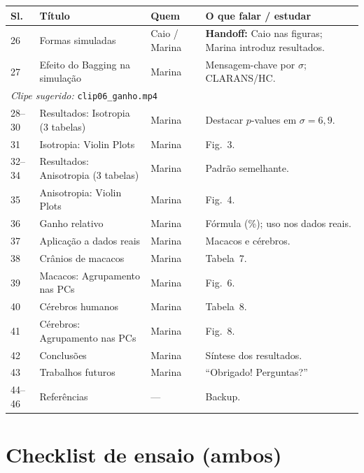 \documentclass[12pt,a4paper]{article}
\begin{document}
\begin{longtable}{@{}p{1.1cm}p{5.2cm}p{2cm}p{5.9cm}@{}}
\toprule
\textbf{Sl.} & \textbf{Título} & \textbf{Quem} & \textbf{O que falar / estudar} \\
\midrule
\endhead
26 & Formas simuladas & Caio / Marina & \textbf{Handoff:} Caio nas figuras; Marina introduz resultados. \\
27 & Efeito do Bagging na simulação & Marina & Mensagem-chave por $\sigma$; CLARANS/HC. \\
\midrule
\multicolumn{4}{l}{\textit{Clipe sugerido:} \texttt{clip06\_ganho.mp4}} \\
\midrule
28--30 & Resultados: Isotropia (3 tabelas) & Marina & Destacar $p$-values em $\sigma=6,9$. \\
31 & Isotropia: Violin Plots & Marina & Fig.~3. \\
32--34 & Resultados: Anisotropia (3 tabelas) & Marina & Padrão semelhante. \\
35 & Anisotropia: Violin Plots & Marina & Fig.~4. \\
36 & Ganho relativo & Marina & Fórmula (\%); uso nos dados reais. \\
37 & Aplicação a dados reais & Marina & Macacos e cérebros. \\
38 & Crânios de macacos & Marina & Tabela~7. \\
39 & Macacos: Agrupamento nas PCs & Marina & Fig.~6. \\
40 & Cérebros humanos & Marina & Tabela~8. \\
41 & Cérebros: Agrupamento nas PCs & Marina & Fig.~8. \\
42 & Conclusões & Marina & Síntese dos resultados. \\
43 & Trabalhos futuros & Marina & ``Obrigado! Perguntas?'' \\
44--46 & Referências & --- & Backup. \\
\bottomrule
\end{longtable}

\section{Checklist de ensaio (ambos)}
\end{document}
